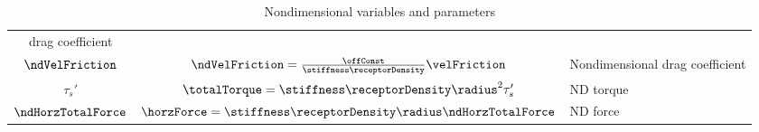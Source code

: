 \begin{table}
\begin{tabular}{ccl}
                                                                   drag
                                                                   coefficient
    \\ 
    $\ndVelFriction$ & $\ndVelFriction = \frac{\offConst}{\stiffness
                       \receptorDensity} \velFriction$ &
                                                         Nondimensional
                                                         drag
                                                         coefficient
    \\
    $\tau_s'$ & $\totalTorque = \stiffness \receptorDensity \radius^2
                \tau_s'$ & ND torque \\
    $\ndHorzTotalForce$ & $\horzForce = \stiffness \receptorDensity
                          \radius \ndHorzTotalForce$ & ND force \\
    \bottomrule
  \end{tabular}
  \caption{Nondimensional variables and parameters}
  \label{tab:nd-vars}
\end{table}
